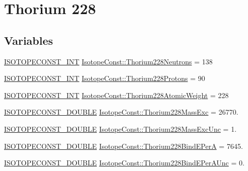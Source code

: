 \hypertarget{group___isotope_const-_thorium-_th228}{}\section{Thorium 228}
\label{group___isotope_const-_thorium-_th228}
\subsection*{Variables}
\begin{DoxyCompactItemize}
\item 
\mbox{\hyperlink{group___isotope_const-_macros_ga5f18360b3e99483a35c32d789e62621c}{I\+S\+O\+T\+O\+P\+E\+C\+O\+N\+S\+T\+\_\+\+I\+NT}} \mbox{\hyperlink{group___isotope_const-_thorium-_th228_ga88ce0f2361fb824573d88c04ad982a90}{Isotope\+Const\+::\+Thorium228\+Neutrons}} = 138
\item 
\mbox{\hyperlink{group___isotope_const-_macros_ga5f18360b3e99483a35c32d789e62621c}{I\+S\+O\+T\+O\+P\+E\+C\+O\+N\+S\+T\+\_\+\+I\+NT}} \mbox{\hyperlink{group___isotope_const-_thorium-_th228_gafe026b3a7b52201de21eaf987660fec4}{Isotope\+Const\+::\+Thorium228\+Protons}} = 90
\item 
\mbox{\hyperlink{group___isotope_const-_macros_ga5f18360b3e99483a35c32d789e62621c}{I\+S\+O\+T\+O\+P\+E\+C\+O\+N\+S\+T\+\_\+\+I\+NT}} \mbox{\hyperlink{group___isotope_const-_thorium-_th228_ga1dfb53e82567d7df38ef73dc7ea01d72}{Isotope\+Const\+::\+Thorium228\+Atomic\+Weight}} = 228
\item 
\mbox{\hyperlink{group___isotope_const-_macros_ga8f45a7272ce02c0b4c65c44636ed719a}{I\+S\+O\+T\+O\+P\+E\+C\+O\+N\+S\+T\+\_\+\+D\+O\+U\+B\+LE}} \mbox{\hyperlink{group___isotope_const-_thorium-_th228_ga167d4304c692ec62c3d48c9f01bb041c}{Isotope\+Const\+::\+Thorium228\+Mass\+Exc}} = 26770.
\item 
\mbox{\hyperlink{group___isotope_const-_macros_ga8f45a7272ce02c0b4c65c44636ed719a}{I\+S\+O\+T\+O\+P\+E\+C\+O\+N\+S\+T\+\_\+\+D\+O\+U\+B\+LE}} \mbox{\hyperlink{group___isotope_const-_thorium-_th228_gaf706d7c9ec24674c2da8f2bb891316bf}{Isotope\+Const\+::\+Thorium228\+Mass\+Exc\+Unc}} = 1.
\item 
\mbox{\hyperlink{group___isotope_const-_macros_ga8f45a7272ce02c0b4c65c44636ed719a}{I\+S\+O\+T\+O\+P\+E\+C\+O\+N\+S\+T\+\_\+\+D\+O\+U\+B\+LE}} \mbox{\hyperlink{group___isotope_const-_thorium-_th228_ga5687716b64cd53a53d5f2c40331e81c3}{Isotope\+Const\+::\+Thorium228\+Bind\+E\+PerA}} = 7645.
\item 
\mbox{\hyperlink{group___isotope_const-_macros_ga8f45a7272ce02c0b4c65c44636ed719a}{I\+S\+O\+T\+O\+P\+E\+C\+O\+N\+S\+T\+\_\+\+D\+O\+U\+B\+LE}} \mbox{\hyperlink{group___isotope_const-_thorium-_th228_gae4e23a6bbd8744217904a641201c65cb}{Isotope\+Const\+::\+Thorium228\+Bind\+E\+Per\+A\+Unc}} = 0.

\end{DoxyCompactItemize}
